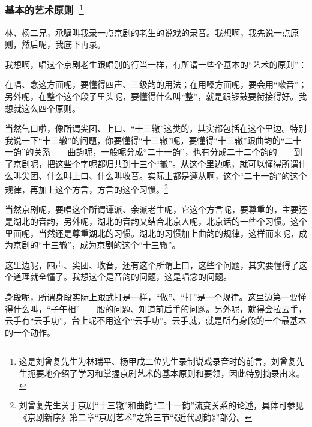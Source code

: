 \newpage
\pagestyle{fancy}    %

\subsubsection{{\hei \large 基本的艺术原则}~\protect\footnote{这是刘曾复先生为林瑞平、杨甲戌二位先生录制说戏录音时的前言，刘曾复先生扼要地介绍了学习和掌握京剧艺术的基本原则和要领，因此特别摘录出来。%
}}%

\textrm{林、杨二兄，承嘱叫我录一点京剧的老生的说戏的录音。我想啊，我先说一点原则，然后呢，我底下再录。}

\textrm{我想啊，唱这个京剧老生跟唱别的行当一样，有所谓一些个基本的``艺术的原则''：}

\textrm{在唱、念这方面呢，要懂得四声、三级韵的用法；在用嗓方面呢，要会用``嗽音''；另外呢，在整个这个段子里头呢，要懂得什么叫``整''，就是跟锣鼓要衔接得好。我想就这么四个原则。}

\textrm{当然气口啦，像所谓尖团、上口、``十三辙''这类的，其实都包括在这个里边。特别我说一下``十三辙''的问题，你要懂得``十三辙''呢，要懂得``十三辙''跟曲韵的``二十一韵''的关系------曲韵呢，一般呢分成``二十一韵''，也有分成二十二个韵的------到了京剧呢，把这些个字呢都归共到十三个``辙''。从这个里边呢，就可以懂得所谓什么叫尖团、什么叫上口、什么叫收音。实际上都是遵从啊，这个``二十一韵''的这个规律，再加上这个方言，方言的这个习惯。}\footnote{刘曾复先生关于京剧``十三辙''和曲韵``二十一韵''流变关系的论述，具体可参见《京剧新序》第二章``京剧艺术''之第三节``《近代剧韵》''部分。%
}

\textrm{当然京剧呢，要唱这个所谓谭派、余派老生呢，它这个方言呢，要尊重的，主要还是湖北的音韵，另外呢，湖北的音韵又结合北京人呢，北京话的一些个习惯。这个里面呢，当然还是尊重湖北的习惯。湖北的习惯加上曲韵的规律，这样而来呢，成为京剧的``十三辙''，成为京剧的这个``十三辙''。}

\textrm{这里边呢，四声、尖团、收音，还有这个所谓上口，这些个问题，其实要懂得了这个道理就全懂了。我想这个是音韵的问题，这是唱念的问题。}

\textrm{身段呢，所谓身段实际上跟武打是一样，``做''、``打''是一个规律。这里边第一要懂得什么叫，``子午相''------腰的问题、知道前后手的问题。另外呢，就得会拉云手，云手有``云手功''，台上呢不用这个``云手功''。云手就，就是所有身段的一个最基本的一个动作。}

